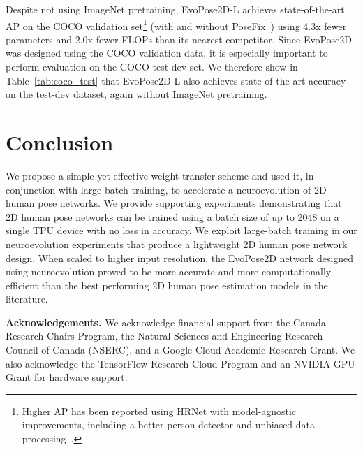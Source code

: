 \documentclass[final]{cvpr}
\begin{document}
Despite not using ImageNet pretraining, EvoPose2D-L achieves state-of-the-art AP on the COCO validation set\footnote{Higher AP has been reported using HRNet with model-agnostic improvements, including a better person detector and unbiased data processing~\cite{huang2020devil}.} (with and without PoseFix~\cite{moon2019posefix}) using 4.3x fewer parameters and 2.0x fewer FLOPs than its nearest competitor. Since EvoPose2D was designed using the COCO validation data, it is especially important to perform evaluation on the COCO test-dev set. We therefore show in Table~\ref{tab:coco_test} that EvoPose2D-L also achieves state-of-the-art accuracy on the test-dev dataset, again without ImageNet pretraining.

\vspace{-4pt}
\section{Conclusion}
\vspace{-4pt}
We propose a simple yet effective weight transfer scheme and used it, in conjunction with large-batch training, to accelerate a neuroevolution of 2D human pose networks. We provide supporting experiments demonstrating that 2D human pose networks can be trained using a batch size of up to 2048 on a single TPU device with no loss in accuracy. We exploit large-batch training in our neuroevolution experiments that produce a lightweight 2D human pose network design. When scaled to higher input resolution, the EvoPose2D network designed using neuroevolution proved to be more accurate and more computationally efficient than the best performing 2D human pose estimation models in the literature. 

\vspace{-2pt}
\medskip\noindent\textbf{Acknowledgements.} We acknowledge financial support from the Canada Research Chairs Program, the Natural Sciences and Engineering Research Council of Canada (NSERC), and a Google Cloud Academic Research Grant. We also acknowledge the TensorFlow Research Cloud Program and an NVIDIA GPU Grant for hardware support. 

{\small


}
\end{document}
